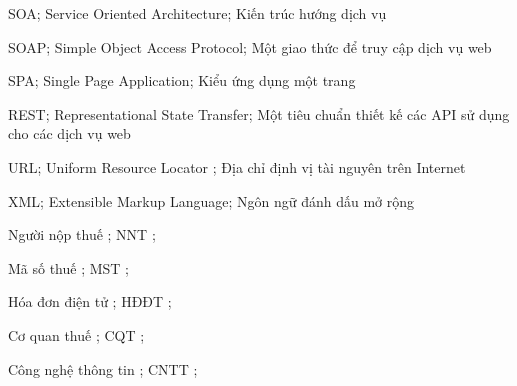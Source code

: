 




SOA; Service Oriented Architecture; Kiến trúc hướng dịch vụ

SOAP; Simple Object Access Protocol; Một giao thức để truy cập dịch vụ web

SPA; Single Page Application; Kiểu ứng dụng một trang

REST; Representational State Transfer; Một tiêu chuẩn thiết kế các API sử dụng cho các dịch vụ web

URL; Uniform Resource Locator ; Địa chỉ định vị tài nguyên trên Internet

XML; Extensible Markup Language; Ngôn ngữ đánh dấu mở rộng


Người nộp thuế ; NNT ;

Mã số thuế ; MST ;

Hóa đơn điện tử ; HĐĐT ;

Cơ quan thuế ; CQT ;

Công nghệ thông tin ; CNTT ;

